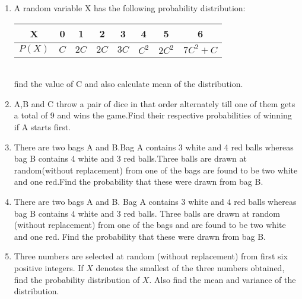 \begin{enumerate}
    \item A random variable X has the following probability distribution:\\
          \begin{tabular}{|c|c|c|c|c|c|c|c|}
              \hline
              X      & 0   & 1    & 2    & 3    & 4       & 5        & 6          \\
              \hline
              $P(X)$ & $C$ & $2C$ & $2C$ & $3C$ & $C^{2}$ & $2C^{2}$ & $7C^{2}+C$ \\
              \hline
          \end{tabular}\\
          find the value of C and also calculate mean of the distribution.
    \item A,B and C throw a pair of dice in that order alternately till one of them gets a total of 9 and wins the game.Find their respective probabilities of winning if A starts first.
    \item There are two bags A and B.Bag A contains 3 white and 4 red balls whereas bag B contains 4 white and 3 red balls.Three balls are drawn at random(without replacement) from one of the bags are found to be two white and one red.Find the probability that these were drawn from bag B.
    \item There are two bags A and B. Bag A contains $3$ white and $4$ red balls whereas bag B contains $4$ white and $3$ red balls. Three balls are drawn at random (without replacement) from one of the bags and are found to be two white and one red. Find the probability that these were drawn from bag B.
    \item Three numbers are selected at random (without replacement) from first six positive integers. If $X$ denotes the smallest of the three numbers obtained, find the probability distribution of $X$. Also find the mean and variance of the distribution.
\end{enumerate}
